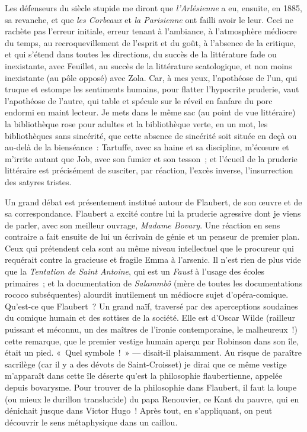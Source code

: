 \documentclass[french,twoside]{book} %
\begin{document}
Les défenseurs du siècle stupide me diront que {\itshape l’Arlésienne} a eu, ensuite, en 1885, sa revanche, et que {\itshape les Corbeaux} et {\itshape la Parisienne} ont failli avoir le leur. Ceci ne rachète pas l’erreur initiale, erreur tenant à l’ambiance, à l’atmosphère médiocre du temps, au recroquevillement de l’esprit et du goût, à l’absence de la critique, et qui s’étend dans toutes les directions, du succès de la littérature fade ou inexistante, avec Feuillet, au succès de la littérature scatologique, et non moins inexistante (au pôle opposé) avec Zola. Car, à mes yeux, l’apothéose de l’un, qui truque et estompe les sentiments humains, pour flatter l’hypocrite pruderie, vaut l’apothéose de l’autre, qui table et spécule sur le réveil en fanfare du porc endormi en maint lecteur. Je mets dans le même sac (au point de vue littéraire) la bibliothèque rose pour adultes et la bibliothèque verte, en un mot, les bibliothèques sans sincérité, que cette absence de sincérité soit située en deçà ou au-delà de la bienséance : Tartuffe, avec sa haine et sa discipline, m’écœure et m’irrite autant que Job, avec son fumier et son tesson ; et l’écueil de la pruderie littéraire est précisément de susciter, par réaction, l’excès inverse, l’insurrection des satyres tristes.\par
Un grand débat est présentement institué autour de Flaubert, de son œuvre et de sa correspondance. Flaubert a excité contre lui la pruderie agressive dont je viens de parler, avec son meilleur ouvrage, {\itshape Madame Bovary}. Une réaction en sens contraire a fait ensuite de lui un écrivain de génie et un penseur de premier plan. Ceux qui prétendent cela sont au même niveau intellectuel que le procureur qui requérait contre la gracieuse et fragile Emma à l’arsenic. Il n’est rien de plus vide que la {\itshape Tentation de Saint Antoine}, qui est un {\itshape Faust} à l’usage des écoles primaires ; et la documentation de {\itshape Salammbô} (mère de toutes les documentations rococo subséquentes) alourdit inutilement un médiocre sujet d’opéra-comique. Qu’est-ce que Flaubert ? Un grand naïf, traversé par des aperceptions soudaines du comique humain et des sottises de la société. Elle est d’Oscar Wilde (railleur puissant et méconnu, un des maîtres de l’ironie contemporaine, le malheureux !) cette remarque, que le premier vestige humain aperçu par Robinson dans son île, était un pied. « Quel symbole ! » — disait-il plaisamment. Au risque de paraître sacrilège (car il y a des dévots de Saint-Croisset) je dirai que ce même vestige m’apparaît dans cette île déserte qu’est la philosophie flaubertienne, appelée depuis bovarysme. Pour trouver de la philosophie dans Flaubert, il faut la loupe (ou mieux le durillon translucide) du papa Renouvier, ce Kant du pauvre, qui en dénichait jusque dans Victor Hugo ! Après tout, en s’appliquant, on peut découvrir le sens métaphysique dans un caillou.\par
\end{document}
